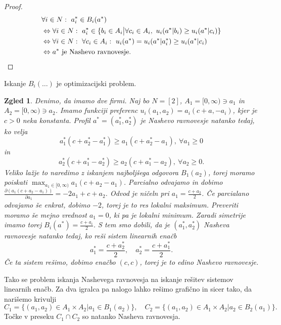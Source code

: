 \documentclass[10pt, a4paper]{article}
\newtheorem{zgled}[izr]{Zgled}
\newenvironment{noticeC}{%
  \tcolorbox[%
  notitle,
  empty,
  enhanced,  %
  breakable,
  coltext=black, 
  fontupper=\rmfamily,
  noparskip,
  sharp corners,
  boxrule=-1pt,  %
  frame hidden,
  left=7pt,  %
  right=7pt,
  top=5pt,
  bottom=5pt,
  before skip=2.5ex plus 2pt,
  after skip=2.5ex plus 2pt,
  overlay unbroken and last={%
  },
  ]}
{\endtcolorbox}
\newenvironment{dokaz}%
  {\begin{noticeC}\begin{proof}}%
  {\end{proof}\end{noticeC}}
\begin{document}
\begin{dokaz}
  \begin{align*}
    &\forall i \in N:\ a_i^* \in B_i (a^*)\\
    &\Leftrightarrow \forall i \in N:\ a_i^* \in \{b_i \in A_i \big| \forall c_i \in A_i,\ u_i(a^* | b_i) \geq u_i (a^* | c_i)\}\\
    &\Leftrightarrow \forall i \in N:\ \forall c_i \in A_i:\ u_i(a^*) = u_i (a^* | a_i^*) \geq u_i(a^* | c_i)\\
    &\Leftrightarrow \text{$a^*$ je Nashevo ravnovesje.} \qedhere
  \end{align*}
\end{dokaz}

Iskanje $B_i (\dots)$ je optimizacijski problem.

\begin{zgled}
  Denimo, da imamo dve firmi.
  Naj bo $N = [2]$, $A_1 = [0, \infty) \ni a_1$ in $A_2 = [0, \infty) \ni a_2$.
  Imamo funkciji preferenc $u_i (a_1, a_2) = a_i (c + a, -a_i)$, kjer je $c > 0$ neka konstanta.
  Profil $a^* = (a_1^*, a_2^*)$ je Nashevo ravnovesje natanko tedaj, ko velja 
  $$a_1^* (c + a_2^* - a_1^*) \geq a_1 (c + a_2^* - a_1),\ \forall a_1 \geq 0$$
  in 
  $$a_2^* (c + a_1^* - a_2^*) \geq a_2 (c + a_1^* - a_2),\ \forall a_2 \geq 0.$$
  Veliko lažje to naredimo z iskanjem najboljšega odgovora $B_1 (a_2)$, torej moramo poiskati $\max_{a_1 \in [0, \infty)} a_1 (c + a_2 - a_1)$.
  Parcialno odvajamo in dobimo $\frac{\partial (a_1 (c + a_2 - a_1))}{\partial a_1} = - 2 a_1 + c + a_2$.
  Odvod je ničeln pri $a_1 = \frac{c + a_2}{2}$. Če parcialano odvajamo še enkrat, dobimo $-2$, torej je to res lokalni maksimum.
  Preveriti moramo še mejno vrednost $a_1 = 0$, ki pa je lokalni minimum.
  Zaradi simetrije imamo torej $B_i (a^*) = \frac{c + a_i}{2}$.
  S tem smo dobili, da je $(a_1^*, a_2^*)$ Nasheva ravnovesje natanko tedaj, ko reši sistem linearnih enačb 
  $$a_1^* = \frac{c + a_2^*}{2}, \quad a_2^* = \frac{c + a_1^*}{2}.$$
  Če ta sistem rešimo, dobimo enačbo $(c, c)$, torej je to edino Nashevo ravnovesje.
\end{zgled}

Tako se problem iskanja Nashevega ravnovesja na iskanje rešitev sistemov linearnih enačb.
Za dva igralca pa nalogo lahko rešimo grafično in sicer tako, da narišemo krivulji 
$$C_1 = \{(a_1, a_2) \in A_1 \times A_2 \big| a_1 \in B_1 (a_2)\},\quad C_2 = \{(a_1, a_2) \in A_1 \times A_2 \big| a_2 \in B_2 (a_1)\}.$$
Točke v preseku $C_1 \cap C_2$ so natanko Nasheva ravnovesja.
\end{document}
